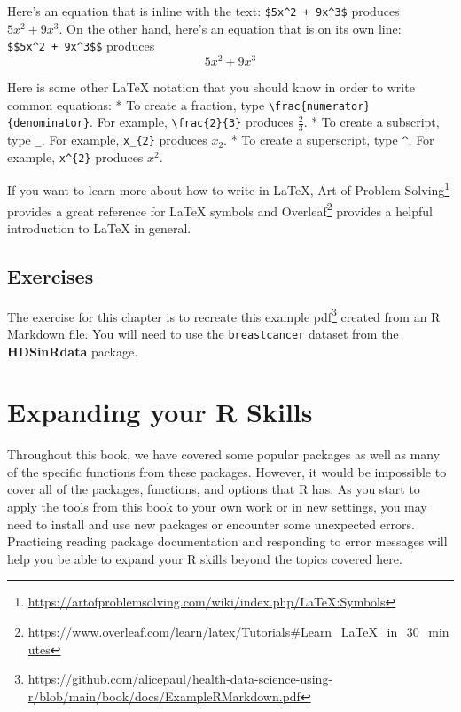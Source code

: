 \documentclass[
  letterpaper,
]{krantz}
\renewcommand{\href}[2]{#2\footnote{\url{#1}}}
\begin{document}
Here's an equation that is inline with the text:
\texttt{\$5x\^{}2\ +\ 9x\^{}3\$} produces \(5x^2 + 9x^3\). On the other
hand, here's an equation that is on its own line:
\texttt{\$\$5x\^{}2\ +\ 9x\^{}3\$\$} produces \[5x^2 + 9x^3\]

Here is some other LaTeX notation that you should know in order to write
common equations: * To create a fraction, type
\texttt{\textbackslash{}frac\{numerator\}\{denominator\}}. For example,
\texttt{\textbackslash{}frac\{2\}\{3\}} produces \(\frac{2}{3}\). * To
create a subscript, type \texttt{\_}. For example, \texttt{x\_\{2\}}
produces \(x_2\). * To create a superscript, type \texttt{\^{}}. For
example, \texttt{x\^{}\{2\}} produces \(x^2\).

If you want to learn more about how to write in LaTeX,
\href{https://artofproblemsolving.com/wiki/index.php/LaTeX:Symbols}{Art
of Problem Solving} provides a great reference for LaTeX symbols and
\href{https://www.overleaf.com/learn/latex/Tutorials\#Learn_LaTeX_in_30_minutes}{Overleaf}
provides a helpful introduction to LaTeX in general.

\hypertarget{exercises-10}{%
\section{Exercises}\label{exercises-10}}

The exercise for this chapter is to recreate
\href{https://github.com/alicepaul/health-data-science-using-r/blob/main/book/docs/ExampleRMarkdown.pdf}{this
example pdf} created from an R Markdown file. You will need to use the
\texttt{breastcancer} dataset from the \textbf{HDSinRdata} package.


\hypertarget{sec-expanding-skills}{%
\chapter{Expanding your R Skills}\label{sec-expanding-skills}}

Throughout this book, we have covered some popular packages as well as
many of the specific functions from these packages. However, it would be
impossible to cover all of the packages, functions, and options that R
has. As you start to apply the tools from this book to your own work or
in new settings, you may need to install and use new packages or
encounter some unexpected errors. Practicing reading package
documentation and responding to error messages will help you be able to
expand your R skills beyond the topics covered here.
\end{document}
